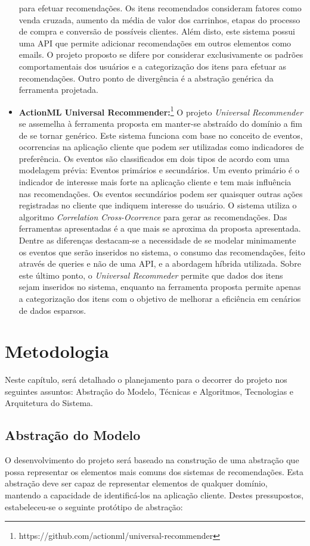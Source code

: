 \documentclass[
	12pt,				%
    oneside,			%
	a4paper,			%
	english,			%
	french,				%
	spanish,			%
	brazil,				%
	]{abntex2}
\begin{document}
\begin{itemize}
	para efetuar recomendações. Os itens recomendados consideram fatores como venda cruzada, aumento da média de valor dos carrinhos, etapas do processo de compra e conversão de possíveis clientes. Além disto, 
	este sistema possui uma API que permite adicionar recomendações em outros elementos como emails. O projeto proposto se difere por considerar exclusivamente os padrões comportamentais dos usuários e a
	categorização dos itens para efetuar as recomendações. Outro ponto de divergência é a abstração genérica da ferramenta projetada. 
	\item \textbf{ActionML Universal Recommender:}\footnote{https://github.com/actionml/universal-recommender} O projeto \textit{Universal Recommender} se assemelha à ferramenta proposta em manter-se abstraído
	do domínio a fim de se tornar genérico. Este sistema funciona com base no conceito de eventos, ocorrencias na aplicação cliente que podem ser utilizadas como indicadores de preferência. Os eventos são
	classificados em dois tipos de acordo com uma modelagem prévia: Eventos primários e secundários. Um evento primário é o indicador de interesse mais forte na aplicação cliente e tem mais influência nas
	recomendações. Os eventos secundários podem ser quaisquer outras ações registradas no cliente que indiquem interesse do usuário. O sistema utiliza o algoritmo \textit{Correlation Cross-Ocorrence} para 
	gerar as recomendações. Das ferramentas apresentadas é a que mais se aproxima da proposta apresentada. Dentre as diferenças destacam-se a necessidade de se modelar minimamente os eventos que serão inseridos
	no sistema, o consumo das recomendações, feito através de queries e não de uma API, e a abordagem híbrida utilizada. Sobre este último ponto, o \textit{Universal Recommeder} permite que dados dos itens sejam 
	inseridos no sistema, enquanto na ferramenta proposta permite apenas a categorização dos itens com o objetivo de melhorar a eficiência em cenários de dados esparsos.
\end{itemize} 

\chapter{Metodologia}
Neste capítulo, será detalhado o planejamento para o decorrer do projeto nos seguintes assuntos: Abstração do Modelo, Técnicas e Algoritmos, Tecnologias e
Arquitetura do Sistema.

\section{Abstração do Modelo}
O desenvolvimento do projeto será baseado na construção de uma abstração que possa representar os elementos mais comuns dos sistemas de recomendações.
Esta abstração deve ser capaz de representar elementos de qualquer domínio, mantendo a capacidade de identificá-los na aplicação cliente. Destes pressupostos, estabeleceu-se o seguinte protótipo de abstração:
\end{document}
